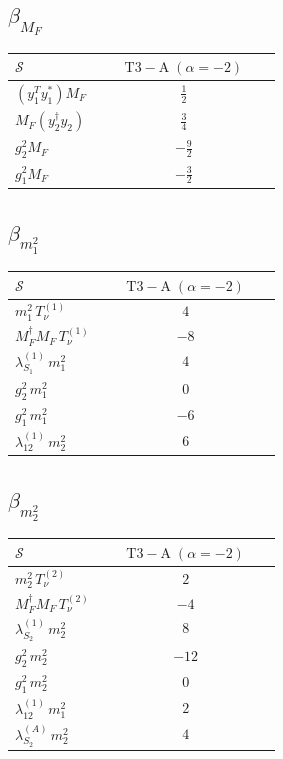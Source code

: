 \documentclass[9pt]{article}
\begin{document}
\subsection*{$ \beta_{M_F} $}
\begin{longtable}{@{}p{0.31\linewidth}c@{}}
\toprule
$\mathcal{S}$ & $ \mathrm{T3-A}\;(\alpha=-2) $ \\
\midrule
$ (y_1^T y_1^*)M_F $ & $ \frac{1}{2} $ \\
$ M_F(y_2^\dagger y_2) $ & $ \frac{3}{4} $ \\
$ g_2^2M_F $ & $ - \frac{9}{2} $ \\
$ g_1^2M_F $ & $ - \frac{3}{2} $ \\
\bottomrule
\end{longtable}
\subsection*{$ \beta_{m_1^{2}} $}
\begin{longtable}{@{}p{0.31\linewidth}c@{}}
\toprule
$\mathcal{S}$ & $ \mathrm{T3-A}\;(\alpha=-2) $ \\
\midrule
$ m_1^{2}\,T_{\nu}^{(1)} $ & $ 4 $ \\
$ M_F^\dagger M_F\,T_{\nu}^{(1)} $ & $ -8 $ \\
$ \lambda_{S_1}^{(1)}\,m_1^{2} $ & $ 4 $ \\
$ g_2^2\,m_1^{2} $ & $ 0 $ \\
$ g_1^2\,m_1^{2} $ & $ -6 $ \\
$ \lambda_{12}^{(1)}\,m_2^{2} $ & $ 6 $ \\
\bottomrule
\end{longtable}
\subsection*{$ \beta_{m_2^{2}} $}
\begin{longtable}{@{}p{0.31\linewidth}c@{}}
\toprule
$\mathcal{S}$ & $ \mathrm{T3-A}\;(\alpha=-2) $ \\
\midrule
$ m_2^{2}\,T_{\nu}^{(2)} $ & $ 2 $ \\
$ M_F^\dagger M_F\,T_{\nu}^{(2)} $ & $ -4 $ \\
$ \lambda_{S_2}^{(1)}\,m_2^{2} $ & $ 8 $ \\
$ g_2^2\,m_2^{2} $ & $ -12 $ \\
$ g_1^2\,m_2^{2} $ & $ 0 $ \\
$ \lambda_{12}^{(1)}\,m_1^{2} $ & $ 2 $ \\
$ \lambda_{S_2}^{(A)}\,m_2^{2} $ & $ 4 $ \\
\bottomrule
\end{longtable}
\end{document}
